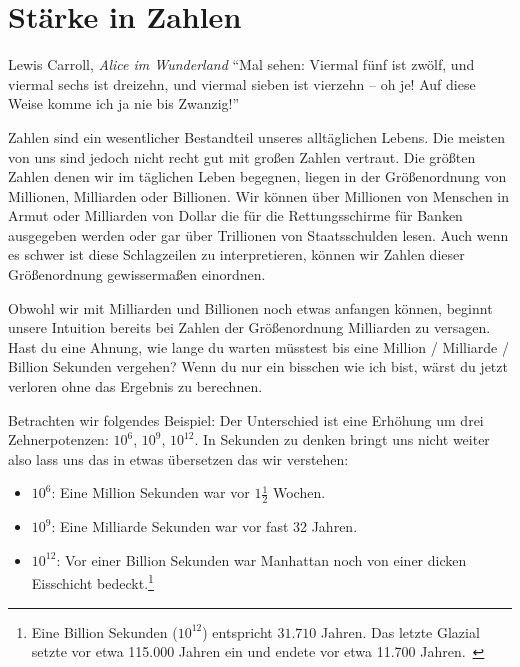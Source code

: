 \chapter{Stärke in Zahlen}
\label{les:15}

\begin{chapquote}{Lewis Carroll, \textit{Alice im Wunderland}}
\enquote{Mal sehen: Viermal fünf ist zwölf, und viermal sechs ist dreizehn, und
viermal sieben ist vierzehn – oh je! Auf diese Weise komme ich ja nie bis
Zwanzig!}
\end{chapquote}

Zahlen sind ein wesentlicher Bestandteil unseres alltäglichen Lebens. Die
meisten von uns sind jedoch nicht recht gut mit großen Zahlen vertraut. Die
größten Zahlen denen wir im täglichen Leben begegnen, liegen in der
Größenordnung von Millionen, Milliarden oder Billionen. Wir können über
Millionen von Menschen in Armut oder Milliarden von Dollar die für die
Rettungsschirme für Banken ausgegeben werden oder gar über Trillionen von
Staatsschulden lesen. Auch wenn es schwer ist diese Schlagzeilen zu
interpretieren, können wir Zahlen dieser Größenordnung gewissermaßen einordnen.

Obwohl wir mit Milliarden und Billionen noch etwas anfangen können, beginnt
unsere Intuition bereits bei Zahlen der Größenordnung Milliarden zu versagen.
Hast du eine Ahnung, wie lange du warten müsstest bis eine Million / Milliarde
/ Billion Sekunden vergehen? Wenn du nur ein bisschen wie ich bist, wärst du
jetzt verloren ohne das Ergebnis zu berechnen.

Betrachten wir folgendes Beispiel: Der Unterschied ist eine Erhöhung um drei
Zehnerpotenzen: $10^6$, $10^9$, $10^{12}$. In Sekunden zu denken bringt uns
nicht weiter also lass uns das in etwas übersetzen das wir verstehen:

\begin{itemize}
  \item $10^6$: Eine Million Sekunden war vor $1 \frac{1}{2}$ Wochen.
  \item $10^9$: Eine Milliarde Sekunden war vor fast 32 Jahren.
  \item $10^{12}$: Vor einer Billion Sekunden war Manhattan noch von einer
  dicken Eisschicht bedeckt.\footnote{Eine Billion Sekunden ($10^{12}$)
  entspricht $31.710$ Jahren. Das letzte Glazial setzte vor etwa 115.000 Jahren
  ein und endete vor etwa 11.700 Jahren.~\cite{wiki:LGM}}
\end{itemize}

